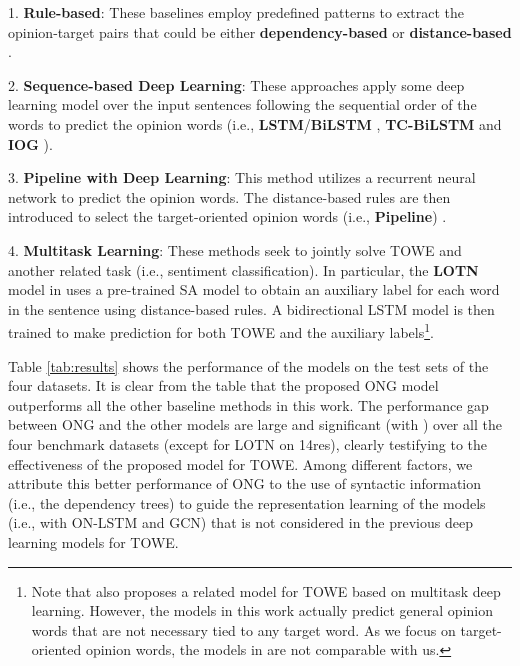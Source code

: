 \documentclass[11pt,a4paper]{article}
\begin{document}
    1. \textbf{Rule-based}: These baselines employ predefined patterns to extract the opinion-target pairs that could be either {\bf dependency-based} \citep{zhuang2006movie} or {\bf distance-based} \citep{hu2004mining}.


    2. \textbf{Sequence-based Deep Learning}: These approaches apply some deep learning model over the input sentences following the sequential order of the words to predict the opinion words (i.e., {\bf LSTM}/{\bf BiLSTM} \citep{liu2015fine}, {\bf TC-BiLSTM} \citep{fan2019target} and {\bf IOG} \citep{fan2019target}).


    3. \textbf{Pipeline with Deep Learning}: This method utilizes a recurrent neural network to predict the opinion words. The distance-based rules are then introduced to select the target-oriented opinion words (i.e., {\bf Pipeline}) \cite{fan2019target}.


    4. \textbf{Multitask Learning}: These methods seek to jointly solve TOWE and another related task (i.e., sentiment classification). In particular, the {\bf LOTN} model in \cite{wu2020latent} uses a pre-trained SA model to obtain an auxiliary label for each word in the sentence using distance-based rules. A bidirectional LSTM model is then trained to make prediction for both TOWE and the auxiliary labels\footnote{Note that \citep{peng2019knowing} also proposes a related model for TOWE based on multitask deep learning. However, the models in this work actually predict general opinion words that are not necessary tied to any target word. As we focus on target-oriented opinion words, the models in \citep{peng2019knowing} are not comparable with us.}.
    








Table \ref{tab:results} shows the performance of the models on the test sets of the four datasets. It is clear from the table that the proposed ONG model outperforms all the other baseline methods in this work. The performance gap between ONG and the other models are large and significant (with ) over all the four benchmark datasets (except for LOTN on 14res), clearly testifying to the effectiveness of the proposed model for TOWE. Among different factors, we attribute this better performance of ONG to the use of syntactic information (i.e., the dependency trees) to guide the representation learning of the models (i.e., with ON-LSTM and GCN) that is not considered in the previous deep learning models for TOWE.
\end{document}
